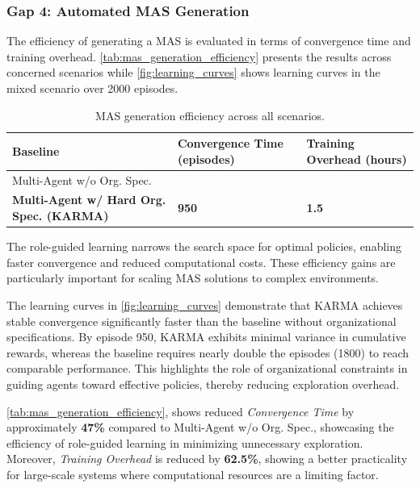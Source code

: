 \subsubsection{Gap 4: Automated MAS Generation}

The efficiency of generating a MAS is evaluated in terms of convergence time and training overhead. \autoref{tab:mas_generation_efficiency} presents the results across concerned scenarios while \autoref{fig:learning_curves} shows learning curves in the mixed scenario over 2000 episodes.

\begin{table}[h]
    \centering
    \caption{MAS generation efficiency across all scenarios.}
    \label{tab:mas_generation_efficiency}{
        \footnotesize
    \begin{tabular}{>{\raggedright\arraybackslash}m{3.5cm}>{\centering\arraybackslash}m{2cm}>{\centering\arraybackslash}m{2cm}}
        \hline
        \textbf{Baseline} & \textbf{Convergence Time (episodes)} & \textbf{Training Overhead (hours)} \\
        \hline
        Multi-Agent w/o Org. Spec. & 1800 & 4 \\
        \textbf{Multi-Agent w/ Hard Org. Spec. (KARMA)} & \textbf{950} & \textbf{1.5} \\
        \hline
    \end{tabular}}
\end{table}

The role-guided learning narrows the search space for optimal policies, enabling faster convergence and reduced computational costs. These efficiency gains are particularly important for scaling MAS solutions to complex environments.

The learning curves in \autoref{fig:learning_curves} demonstrate that KARMA achieves stable convergence significantly faster than the baseline without organizational specifications. By episode 950, KARMA exhibits minimal variance in cumulative rewards, whereas the baseline requires nearly double the episodes (1800) to reach comparable performance. This highlights the role of organizational constraints in guiding agents toward effective policies, thereby reducing exploration overhead.

\autoref{tab:mas_generation_efficiency}, shows reduced \textit{Convergence Time} by approximately \textbf{47\%} compared to Multi-Agent w/o Org. Spec., showcasing the efficiency of role-guided learning in minimizing unnecessary exploration. Moreover, \textit{Training Overhead} is reduced by \textbf{62.5\%}, showing a better practicality for large-scale systems where computational resources are a limiting factor.

